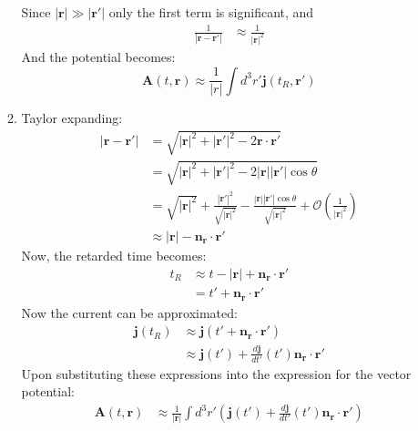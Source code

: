 \documentclass[12pt,a4]{article}
\begin{document}
\begin{enumerate}
\begin{enumerate}
        Since $|\mathbf{r}| \gg |\mathbf{r}'|$ only the first term is significant, and
        \begin{align*}
          \frac{1}{|\mathbf{r} - \mathbf{r}'|} &\approx \frac{1}{|\mathbf{r}|^2}
        \end{align*}
        And the potential becomes:
        \begin{equation*}
          \mathbf{A}(t, \mathbf{r}) \approx \frac{1}{|r|} \int d^3 r' \mathbf{j}(t_R, \mathbf{r}')
        \end{equation*}
      \item
        Taylor expanding:
        \begin{align*}
          |\mathbf{r} - \mathbf{r}'| &= \sqrt{|\mathbf{r}|^2 + |\mathbf{r}'|^2 - 2 \mathbf{r} \cdot \mathbf{r}'}\\
                                     &= \sqrt{|\mathbf{r}|^2 + |\mathbf{r}'|^2 - 2 |\mathbf{r}| |\mathbf{r}'| \cos \theta}\\
                                     &= \sqrt{|\mathbf{r}|^2} + \frac{|\mathbf{r}'|^2}{\sqrt{|\mathbf{r}|^2}} - \frac{|\mathbf{r}| |\mathbf{r}'| \cos \theta}{\sqrt{|\mathbf{r}|^2}} + \mathcal{O}\left(\frac{1}{|\mathbf{r}|^2}\right)\\
                                     &\approx |\mathbf{r}|  - \mathbf{n}_\mathbf{r} \cdot \mathbf{r}'
        \end{align*}
        Now, the retarded time becomes:
        \begin{align*}
          t_R &\approx t - |\mathbf{r}|  + \mathbf{n}_\mathbf{r} \cdot \mathbf{r}'\\
              &=       t'  + \mathbf{n}_\mathbf{r} \cdot \mathbf{r}'
        \end{align*}
        Now the current can be approximated:
        \begin{align*}
          \mathbf{j}(t_R) &\approx \mathbf{j}(t' + \mathbf{n}_\mathbf{r} \cdot \mathbf{r}')\\
                          &\approx \mathbf{j}(t')  + \frac{d \mathbf{j}}{dt'}(t') \mathbf{n}_\mathbf{r} \cdot \mathbf{r}'
        \end{align*}
        Upon substituting these expressions into the expression for the vector potential:
        \begin{align*}
          \mathbf{A}(t,\mathbf{r}) &\approx \frac{1}{|\mathbf{r}|} \int d^3r' \left(\mathbf{j}(t')  + \frac{d \mathbf{j}}{dt'}(t') \mathbf{n}_\mathbf{r} \cdot \mathbf{r}'\right)\\

\end{align*}
\end{enumerate}
\end{enumerate}
\end{document}
